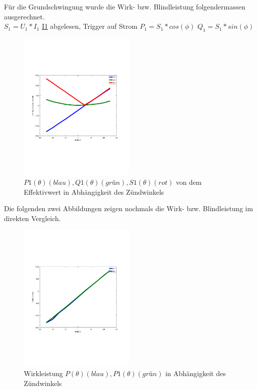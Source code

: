 Für die Grundschwingung wurde die Wirk- bzw. Blindleistung folgendermassen ausgerechnet.\\
$S_1 = U_1 * I_1$
\underline{I1} abgelesen, Trigger auf Strom
$P_1 = S_1 * cos(\phi)$
$Q_1 = S_1 * sin(\phi)$
\begin{figure}[!ht]
  \begin{center}
  \includegraphics[width=0.5\textwidth, trim={1cm 6.5cm 2cm 7cm},clip]{pic/6_1_grundfrequenztaktung/6_1_2_einst_wirk_und_blindleistung/P1_Q1_S1.pdf}
  \caption{$P1(\theta) (blau), Q1(\theta) (grün), S1(\theta) (rot)$ von dem Effektivwert in Abhängigkeit des Zündwinkels}
  \label{fig:6_1_2_1}
  \end{center}
\end{figure}

Die folgenden zwei Abbildungen zeigen nochmals die Wirk- bzw. Blindleistung im direkten Vergleich.


\begin{figure}[H]
  \begin{center}
  \includegraphics[width=0.5\textwidth, trim={1cm 6.5cm 2cm 7cm},clip]{pic/6_1_grundfrequenztaktung/6_1_2_einst_wirk_und_blindleistung/P_P1.pdf}
  \caption{Wirkleistung $P(\theta)(blau), P1(\theta) (grün)$ in Abhängigkeit des Zündwinkels}
  \label{fig:6_1_2_2}
  \end{center}
\end{figure}

